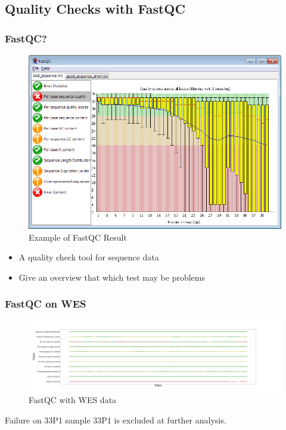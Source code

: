 \documentclass{beamer}
\begin{document}
    \subsection{Quality Checks with FastQC}
    \begin{frame}
        \frametitle{FastQC?}

        \begin{figure}
            \includegraphics[width=0.5 \linewidth]{figures/Workflow/FastQC.png}
            \caption{Example of FastQC Result \protect\cite{fastqc1}}
        \end{figure}

        \begin{itemize}
            \item A quality check tool for sequence data
            \item Give an overview that which test may be problems
        \end{itemize}
    \end{frame}

    \begin{frame}
        \frametitle{FastQC on WES}

        \begin{figure}
            \includegraphics[width=\linewidth]{figures/FastQC/FastQC_WES.pdf}
            \caption{FastQC with WES data}
        \end{figure}

        \begin{alertblock}{Failure on 33P1 sample}
            33P1 is excluded at further analysis.
        \end{alertblock}
    \end{frame}
\end{document}
